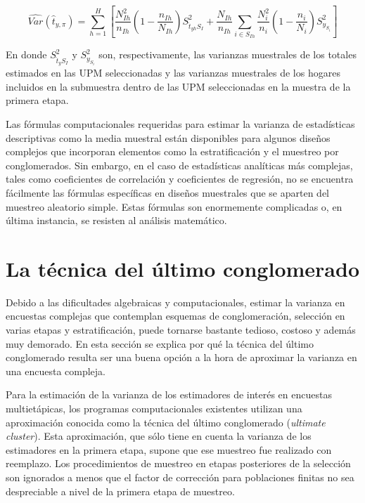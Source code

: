 \documentclass[
  12pt,
]{book}
\begin{document}
\[
\widehat{Var}(\hat{t}_{y,\pi})=
\sum_{h=1}^H\left[\frac{N_{Ih}^2}{n_{Ih}}\left(1-\frac{n_{Ih}}{N_{Ih}}\right)S^2_{\hat{t}_{yh}S_I}+
\frac{N_{Ih}}{n_{Ih}}\sum_{i\in S_{Ih}}\frac{N_i^2}{n_i}\left(1-\frac{n_i}{N_i}\right)S^2_{y_{S_i}}\right]
\]

En donde \(S^2_{\hat{t}_{y}S_I}\) y \(S^2_{y_{S_i}}\) son, respectivamente, las varianzas muestrales de los totales estimados en las UPM seleccionadas y las varianzas muestrales de los hogares incluidos en la submuestra dentro de las UPM seleccionadas en la muestra de la primera etapa.

Las fórmulas computacionales requeridas para estimar la varianza de estadísticas descriptivas como la media muestral están disponibles para algunos diseños complejos que incorporan elementos como la estratificación y el muestreo por conglomerados. Sin embargo, en el caso de estadísticas analíticas más complejas, tales como coeficientes de correlación y coeficientes de regresión, no se encuentra fácilmente las fórmulas específicas en diseños muestrales que se aparten del muestreo aleatorio simple. Estas fórmulas son enormemente complicadas o, en última instancia, se resisten al análisis matemático.

\hypertarget{la-tuxe9cnica-del-uxfaltimo-conglomerado}{%
\section{La técnica del último conglomerado}\label{la-tuxe9cnica-del-uxfaltimo-conglomerado}}

Debido a las dificultades algebraicas y computacionales, estimar la varianza en encuestas complejas que contemplan esquemas de conglomeración, selección en varias etapas y estratificación, puede tornarse bastante tedioso, costoso y además muy demorado. En esta sección se explica por qué la técnica del último conglomerado resulta ser una buena opción a la hora de aproximar la varianza en una encuesta compleja.

Para la estimación de la varianza de los estimadores de interés en encuestas multietápicas, los programas computacionales existentes utilizan una aproximación conocida como la técnica del último conglomerado (\emph{ultimate cluster}). Esta aproximación, que sólo tiene en cuenta la varianza de los estimadores en la primera etapa, supone que ese muestreo fue realizado con reemplazo. Los procedimientos de muestreo en etapas posteriores de la selección son ignorados a menos que el factor de corrección para poblaciones finitas no sea despreciable a nivel de la primera etapa de muestreo.
\end{document}
